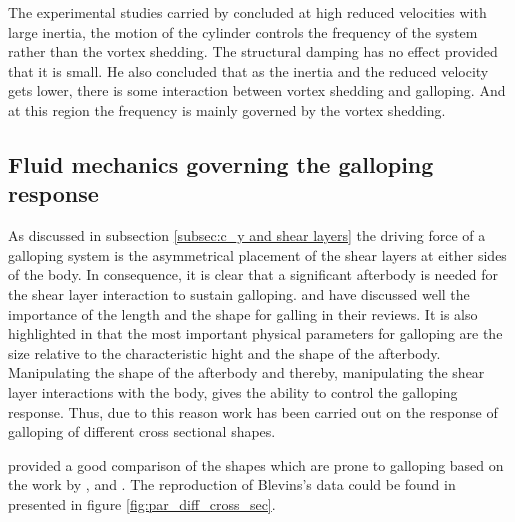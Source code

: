  The experimental studies carried by \citet{bouclin:77} concluded at high reduced velocities with large inertia, the motion of the cylinder controls the frequency of the system rather than the vortex shedding. The structural damping has no effect provided that it is small. He also concluded that as the inertia and the reduced velocity gets lower, there is some interaction between vortex shedding and galloping. And at this region the frequency is mainly governed by the vortex shedding. 
 
 
 \subsection{Fluid mechanics governing the galloping response}
 
 As discussed in subsection \ref{subsec:c_y and shear layers} the driving force of a galloping system is the asymmetrical placement of the shear layers at either sides of the body. In consequence, it is clear that a significant afterbody is needed for the shear layer interaction to sustain galloping. \citet{Parkinson1974,Parkinson1989} and \citet{Bearman1987} have discussed well the importance of the length and the shape for galling in their reviews. It is also highlighted in \citet{Parkinson1974} that the most important physical parameters for galloping are the size relative to the characteristic hight and the shape of the afterbody. Manipulating the shape of the afterbody and thereby, manipulating the shear layer interactions with the body, gives the ability to control the galloping response. Thus, due to this reason work has been carried out on the response of galloping of different cross sectional shapes. 
 
 \citet{Blevins1990} provided a good comparison of the shapes which are prone to galloping based on the work by \citet{Parkinson1961}, \citet{Nakamura1975a} and \citet{Nakamura1977}. The reproduction of Blevins's data could be found in \citet{Paidoussis2010} presented in figure \ref{fig:par_diff_cross_sec}. 
    
 
  

